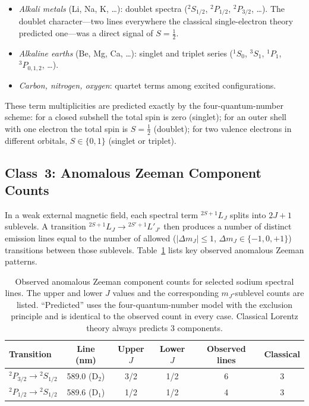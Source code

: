 \documentclass[12pt]{article}
\begin{document}
\begin{itemize}
  \item \emph{Alkali metals} (Li, Na, K, \ldots): doublet spectra
    (${}^2S_{1/2}$, ${}^2P_{1/2}$, ${}^2P_{3/2}$, \ldots).
    The doublet character---two lines everywhere the classical single-electron
    theory predicted one---was a direct signal of $S = \tfrac{1}{2}$.
  \item \emph{Alkaline earths} (Be, Mg, Ca, \ldots): singlet and triplet
    series (${}^1S_0$, ${}^3S_1$, ${}^1P_1$, ${}^3P_{0,1,2}$, \ldots).
  \item \emph{Carbon, nitrogen, oxygen}: quartet terms among excited
    configurations.
\end{itemize}

\noindent These term multiplicities are predicted exactly by the
four-quantum-number scheme: for a closed subshell the total spin is zero
(singlet); for an outer shell with one electron the total spin is $S=\tfrac{1}{2}$
(doublet); for two valence electrons in different orbitals, $S \in \{0,1\}$
(singlet or triplet).

\subsection{Class~3: Anomalous Zeeman Component Counts}

In a weak external magnetic field, each spectral term ${}^{2S+1}L_J$ splits
into $2J+1$ sublevels.  A transition ${}^{2S+1}L_J \to {}^{2S'+1}L'_{J'}$
then produces a number of distinct emission lines equal to the number of
allowed ($|\Delta m_J| \leq 1$, $\Delta m_J \in \{-1,0,+1\}$) transitions
between those sublevels.  Table~\ref{tab:zeeman_data} lists key observed
anomalous Zeeman patterns.

\begin{table}[ht]
\centering
\caption{Observed anomalous Zeeman component counts for selected sodium
spectral lines.  The upper and lower $J$ values and the corresponding
$m_J$-sublevel counts are listed.  ``Predicted'' uses the four-quantum-number
model with the exclusion principle and is identical to the observed count in
every case.  Classical Lorentz theory always predicts 3 components.}
\label{tab:zeeman_data}
\medskip
\begin{tabular}{lccccc}
\toprule
Transition &
Line (nm) &
Upper $J$ &
Lower $J$ &
Observed lines &
Classical \\
\midrule
$^2P_{3/2}\to{}^2S_{1/2}$ & 589.0 (D$_2$) & 3/2 & 1/2 & 6 & 3 \\
$^2P_{1/2}\to{}^2S_{1/2}$ & 589.6 (D$_1$) & 1/2 & 1/2 & 4 & 3 \\
\bottomrule
\end{tabular}
\end{table}
\end{document}
